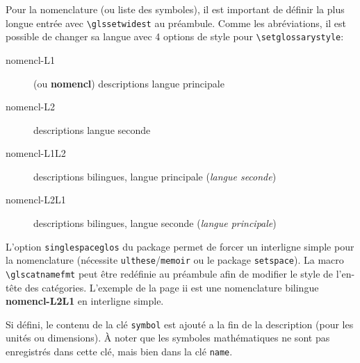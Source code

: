\documentclass[projet,nohyperref,article,english,french]{ulthese}
\begin{document}
Pour la nomenclature (ou liste des symboles), il est important de définir la plus longue entrée avec \texttt{\textbackslash glssetwidest} au préambule.
Comme les abréviations, il est possible de changer sa langue avec 4 options de style pour \texttt{\textbackslash setglossarystyle}:
\begin{description}
	\item[nomencl-L1] (ou \textbf{nomencl}) descriptions langue principale
	\item[nomencl-L2] descriptions langue seconde
	\item[nomencl-L1L2] descriptions bilingues, langue principale (\textit{langue seconde})
	\item[nomencl-L2L1] descriptions bilingues, langue seconde (\textit{langue principale})
\end{description}
L'option \texttt{singlespaceglos} du package permet de forcer un interligne simple pour la nomenclature (nécessite \texttt{ulthese}/\texttt{memoir} ou le package \texttt{setspace}). La macro \texttt{\textbackslash glscatnamefmt} peut être redéfinie au préambule afin de modifier le style de l'en-tête des catégories. L'exemple de la page ii est une nomenclature bilingue \textbf{nomencl-L2L1} en interligne simple.

Si défini, le contenu de la clé \texttt{symbol} est ajouté a la fin de la description (pour les unités ou dimensions). À noter que les symboles mathématiques ne sont pas enregistrés dans cette clé, mais bien dans la clé \texttt{name}.
\end{document}
